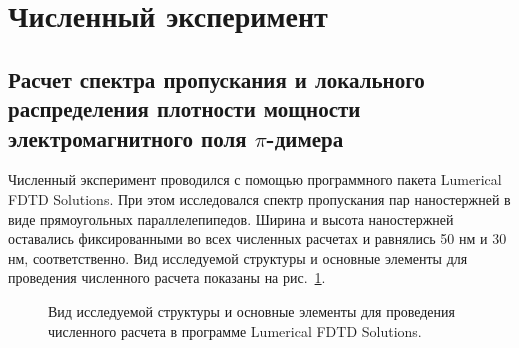 \section{Численный эксперимент}
\subsection{Расчет спектра пропускания и локального распределения плотности мощности электромагнитного поля $ \pi $-димера}

Численный эксперимент проводился с помощью программного пакета Lumerical FDTD Solutions. При этом исследовался спектр пропускания пар наностержней в виде прямоугольных параллелепипедов. Ширина и высота наностержней оставались фиксированными во всех численных расчетах и равнялись 50 нм и 30 нм, соответственно. Вид исследуемой структуры и основные элементы для проведения численного расчета показаны на рис.~\ref{img:lumerical}. 
\begin{figure}
\caption{Вид исследуемой структуры и основные элементы для проведения численного расчета в программе Lumerical FDTD Solutions.}
\label{img:lumerical}
\end{figure}

